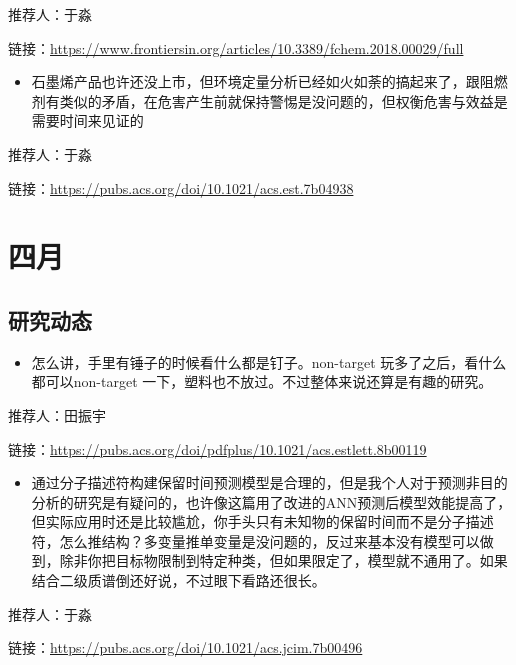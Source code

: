 \documentclass[]{book}
\providecommand{\tightlist}{%
  \setlength{\itemsep}{0pt}\setlength{\parskip}{0pt}}
\begin{document}
推荐人：于淼

链接：\url{https://www.frontiersin.org/articles/10.3389/fchem.2018.00029/full}

\begin{itemize}
\tightlist
\item
  石墨烯产品也许还没上市，但环境定量分析已经如火如荼的搞起来了，跟阻燃剂有类似的矛盾，在危害产生前就保持警惕是没问题的，但权衡危害与效益是需要时间来见证的
\end{itemize}

推荐人：于淼

链接：\url{https://pubs.acs.org/doi/10.1021/acs.est.7b04938}

\hypertarget{ux56dbux6708}{%
\section*{四月}\label{ux56dbux6708}}

\hypertarget{ux7814ux7a76ux52a8ux6001-5}{%
\subsection*{研究动态}\label{ux7814ux7a76ux52a8ux6001-5}}

\begin{itemize}
\tightlist
\item
  怎么讲，手里有锤子的时候看什么都是钉子。non-target 玩多了之后，看什么都可以non-target 一下，塑料也不放过。不过整体来说还算是有趣的研究。
\end{itemize}

推荐人：田振宇

链接：\url{https://pubs.acs.org/doi/pdfplus/10.1021/acs.estlett.8b00119}

\begin{itemize}
\tightlist
\item
  通过分子描述符构建保留时间预测模型是合理的，但是我个人对于预测非目的分析的研究是有疑问的，也许像这篇用了改进的ANN预测后模型效能提高了，但实际应用时还是比较尴尬，你手头只有未知物的保留时间而不是分子描述符，怎么推结构？多变量推单变量是没问题的，反过来基本没有模型可以做到，除非你把目标物限制到特定种类，但如果限定了，模型就不通用了。如果结合二级质谱倒还好说，不过眼下看路还很长。
\end{itemize}

推荐人：于淼

链接：\url{https://pubs.acs.org/doi/10.1021/acs.jcim.7b00496}
\end{document}
